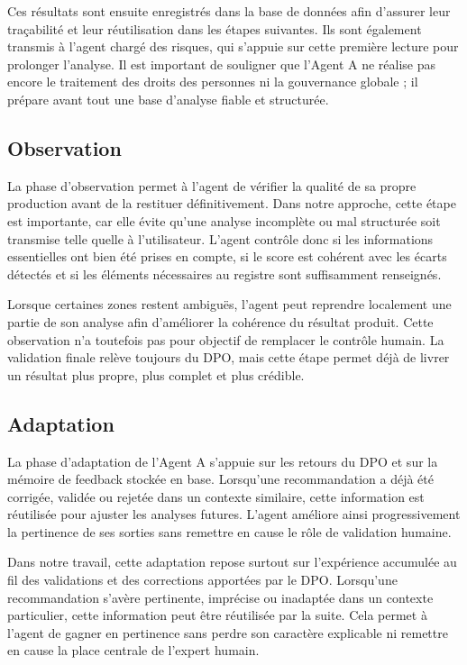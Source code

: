 \documentclass[12pt,a4paper]{report}
\begin{document}
Ces résultats sont ensuite enregistrés dans la base de données afin d'assurer leur traçabilité et leur réutilisation dans les étapes suivantes. Ils sont également transmis à l'agent chargé des risques, qui s'appuie sur cette première lecture pour prolonger l'analyse. Il est important de souligner que l'Agent A ne réalise pas encore le traitement des droits des personnes ni la gouvernance globale ; il prépare avant tout une base d'analyse fiable et structurée.

\subsection{Observation}

La phase d'observation permet à l'agent de vérifier la qualité de sa propre production avant de la restituer définitivement. Dans notre approche, cette étape est importante, car elle évite qu'une analyse incomplète ou mal structurée soit transmise telle quelle à l'utilisateur. L'agent contrôle donc si les informations essentielles ont bien été prises en compte, si le score est cohérent avec les écarts détectés et si les éléments nécessaires au registre sont suffisamment renseignés.

Lorsque certaines zones restent ambiguës, l'agent peut reprendre localement une partie de son analyse afin d'améliorer la cohérence du résultat produit. Cette observation n'a toutefois pas pour objectif de remplacer le contrôle humain. La validation finale relève toujours du DPO, mais cette étape permet déjà de livrer un résultat plus propre, plus complet et plus crédible.

\subsection{Adaptation}

La phase d'adaptation de l'Agent A s'appuie sur les retours du DPO et sur la mémoire de feedback stockée en base. Lorsqu'une recommandation a déjà été corrigée, validée ou rejetée dans un contexte similaire, cette information est réutilisée pour ajuster les analyses futures. L'agent améliore ainsi progressivement la pertinence de ses sorties sans remettre en cause le rôle de validation humaine.

Dans notre travail, cette adaptation repose surtout sur l'expérience accumulée au fil des validations et des corrections apportées par le DPO. Lorsqu'une recommandation s'avère pertinente, imprécise ou inadaptée dans un contexte particulier, cette information peut être réutilisée par la suite. Cela permet à l'agent de gagner en pertinence sans perdre son caractère explicable ni remettre en cause la place centrale de l'expert humain.
\end{document}
